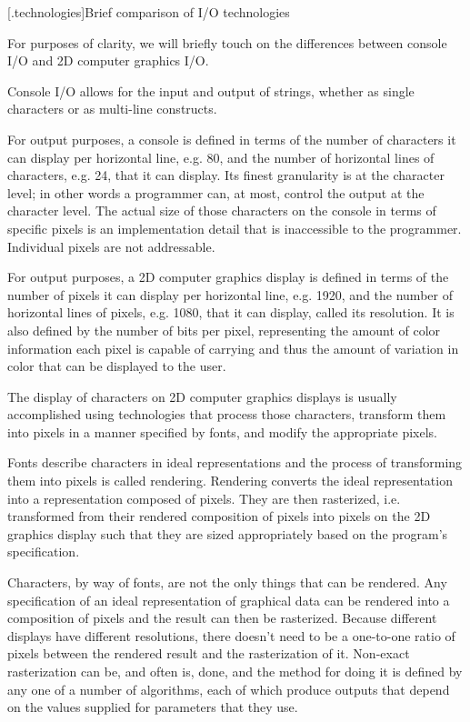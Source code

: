 [\iotwod.technologies]{Brief comparison of I/O technologies}

\pnum
For purposes of clarity, we will briefly touch on the differences between console I/O and 2D computer graphics I/O.

\pnum
Console I/O allows for the input and output of strings, whether as single characters or as multi-line constructs.

\pnum
For output purposes, a console is defined in terms of the number of characters it can display per horizontal line, e.g. 80, and the number of horizontal lines of characters, e.g. 24, that it can display. Its finest granularity is at the character level; in other words a programmer can, at most, control the output at the character level. The actual size of those characters on the console in terms of specific pixels is an implementation detail that is inaccessible to the programmer. Individual pixels are not addressable.

\pnum
For output purposes, a 2D computer graphics display is defined in terms of the number of pixels it can display per horizontal line, e.g. 1920, and the number of horizontal lines of pixels, e.g. 1080, that it can display, called its resolution. It is also defined by the number of bits per pixel, representing the amount of color information each pixel is capable of carrying and thus the amount of variation in color that can be displayed to the user.

\pnum
The display of characters on 2D computer graphics displays is usually accomplished using technologies that process those characters, transform them into pixels in a manner specified by fonts, and modify the appropriate pixels.

\pnum
Fonts describe characters in ideal representations and the process of transforming them into pixels is called rendering. Rendering converts the ideal representation into a representation composed of pixels. They are then rasterized, i.e. transformed from their rendered composition of pixels into pixels on the 2D graphics display such that they are sized appropriately based on the program's specification.

\pnum
Characters, by way of fonts, are not the only things that can be rendered. Any specification of an ideal representation of graphical data can be rendered into a composition of pixels and the result can then be rasterized. Because different displays have different resolutions, there doesn't need to be a one-to-one ratio of pixels between the rendered result and the rasterization of it. Non-exact rasterization can be, and often is, done, and the method for doing it is defined by any one of a number of algorithms, each of which produce outputs that depend on the values supplied for parameters that they use.

